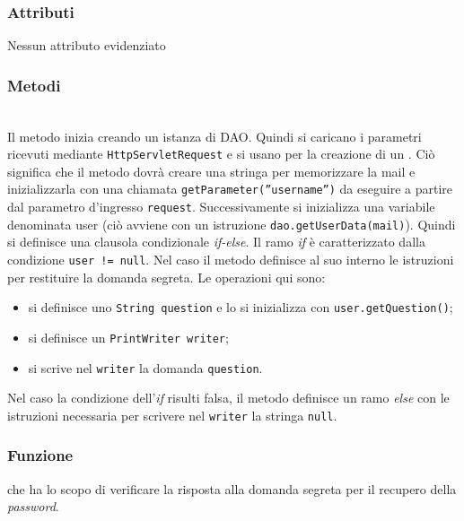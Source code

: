 \subsubsection*{Attributi}

Nessun attributo evidenziato

\subsubsection*{Metodi}
\begin{description}
	\item{}\\

Il metodo inizia creando un istanza di  DAO. Quindi si caricano i parametri ricevuti mediante \texttt{HttpServletRequest} e si usano per la creazione di un . Ciò significa che il metodo dovrà creare una stringa per memorizzare la mail e inizializzarla con una chiamata \texttt{getParameter(''username'')} da eseguire a partire dal parametro d'ingresso \texttt{request}. Successivamente si inizializza una variabile  denominata user (ciò avviene con un istruzione \verb|dao.getUserData(mail)|). Quindi si definisce una clausola condizionale \textit{if-else}. Il ramo \textit{if} è caratterizzato dalla condizione \texttt{user != null}. Nel caso il metodo definisce al suo interno le istruzioni per restituire la domanda segreta. Le operazioni qui sono:
\begin{itemize}
	\item si definisce uno \texttt{String question} e lo si inizializza con \verb|user.getQuestion()|;
	\item si definisce un \texttt{PrintWriter writer};
	\item si scrive nel \texttt{writer} la domanda \texttt{question}.
\end{itemize}

Nel caso la condizione dell'\textit{if} risulti falsa, il metodo definisce un ramo \textit{else} con le istruzioni necessaria per scrivere nel \texttt{writer} la stringa \texttt{null}.
\end{description}


\subsubsection*{Funzione}
 che ha lo scopo di verificare la risposta alla domanda segreta per il recupero della \textit{password}.

